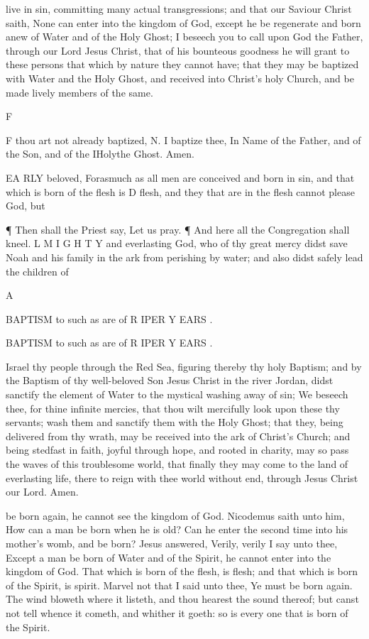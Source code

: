 live in sin, committing many actual transgressions; and that our Saviour Christ saith, None can enter into the kingdom of God, except he be regenerate and born anew of Water and of the Holy Ghost; I beseech you to call upon God the Father, through our Lord Jesus Christ, that of his bounteous goodness he will grant to these persons that which by nature they cannot have; that they may be baptized with Water and the Holy Ghost, and received into Christ’s holy Church, and be made lively members of the same.

F

F thou art not already baptized, N. I baptize thee, In Name of the Father, and of the Son, and of the IHolythe Ghost. Amen.

EA RLY beloved, Forasmuch as all men are conceived and born in sin, and that which is born of the flesh is D flesh, and they that are in the flesh cannot please God, but

¶ Then shall the Priest say, Let us pray. ¶ And here all the Congregation shall kneel. L M I G H T Y and everlasting God, who of thy great mercy didst save Noah and his family in the ark from perishing by water; and also didst safely lead the children of

A

BAPTISM to such as are of R IPER Y EARS .

BAPTISM to such as are of R IPER Y EARS .

Israel thy people through the Red Sea, figuring thereby thy holy Baptism; and by the Baptism of thy well-beloved Son Jesus Christ in the river Jordan, didst sanctify the element of Water to the mystical washing away of sin; We beseech thee, for thine infinite mercies, that thou wilt mercifully look upon these thy servants; wash them and sanctify them with the Holy Ghost; that they, being delivered from thy wrath, may be received into the ark of Christ’s Church; and being stedfast in faith, joyful through hope, and rooted in charity, may so pass the waves of this troublesome world, that finally they may come to the land of everlasting life, there to reign with thee world without end, through Jesus Christ our Lord. Amen.

be born again, he cannot see the kingdom of God. Nicodemus saith unto him, How can a man be born when he is old? Can he enter the second time into his mother's womb, and be born? Jesus answered, Verily, verily I say unto thee, Except a man be born of Water and of the Spirit, he cannot enter into the kingdom of God. That which is born of the flesh, is flesh; and that which is born of the Spirit, is spirit. Marvel not that I said unto thee, Ye must be born again. The wind bloweth where it listeth, and thou hearest the sound thereof; but canst not tell whence it cometh, and whither it goeth: so is every one that is born of the Spirit.

